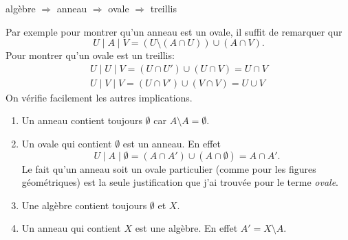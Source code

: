 \begin{prop}
  algèbre $\Rightarrow$ anneau $\Rightarrow$ ovale $\Rightarrow$ treillis
\end{prop}
\begin{demo}
Par exemple pour montrer qu'un anneau est un ovale, il suffit de remarquer qur 
\begin{displaymath}
  U \mid A \mid V = (U \setminus (A \cap U)) \cup (A \cap V).
\end{displaymath}
Pour montrer qu'un ovale est un treillis:
\begin{align*}
  U \mid U \mid V = (U \cap U') \cup (U \cap V) = U \cap V \\
  U \mid V \mid V = (U \cap V') \cup (V \cap V) = U \cup V
\end{align*}
On vérifie facilement les autres implications.
\end{demo}
\begin{rems}
 \begin{enumerate}
  \item Un anneau contient toujours $\emptyset$ car $A \setminus A = \emptyset$.
  \item Un ovale qui contient $\emptyset$ est un anneau. En effet
    \begin{displaymath}
      U \mid A \mid \emptyset = (A \cap A')\cup (A \cap \emptyset) = A \cap A'.
    \end{displaymath}
    Le fait qu'un anneau soit un ovale particulier (comme pour les figures géométriques) est la seule justification que j'ai trouvée pour le terme \emph{ovale}.
  \item Une algèbre contient toujours $\emptyset$ et $X$.
  \item Un anneau qui contient $X$ est une algèbre. En effet $A' = X \setminus A$.
 \end{enumerate}
\end{rems}

